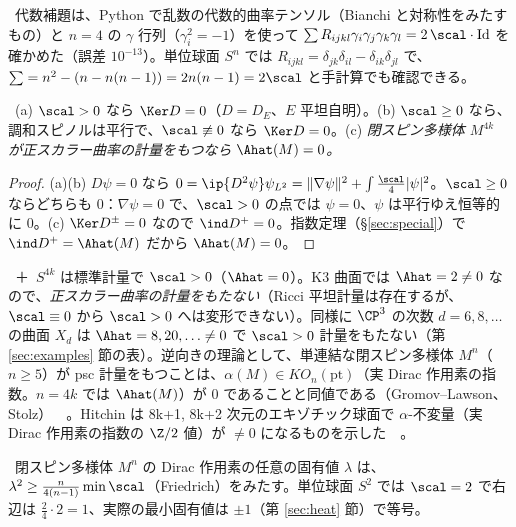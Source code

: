 \begin{rem}[検算]\label{rem:LichCheck}\tP\
代数補題は、Python で乱数の代数的曲率テンソル（Bianchi と対称性をみたすもの）と $n=4$ の $\gamma$ 行列（$\gamma_i^2=-1$）を使って $\sum R_{ijkl}\gamma_i\gamma_j\gamma_k\gamma_l=2\,\scal\cdot\mathrm{Id}$ を確かめた（誤差 $10^{-13}$）。単位球面 $S^n$ では $R_{ijkl}=\delta_{jk}\delta_{il}-\delta_{ik}\delta_{jl}$ で、$\sum=n^2-(n-n(n-1))=2n(n-1)=2\scal$ と手計算でも確認できる。
\end{rem}
\begin{cor}[Lichnerowicz]\label{cor:Lich}\tP\
(a) $\scal>0$ なら $\Ker D=0$（$D=D_{E}$、$E$ 平坦自明）。(b) $\scal\ge0$ なら、調和スピノルは平行で、$\scal\not\equiv0$ なら $\Ker D=0$。(c) \emph{閉スピン多様体 $M^{4k}$ が正スカラー曲率の計量をもつなら $\Ahat(M)=0$。}
\end{cor}
\begin{proof}
(a)(b) $D\psi=0$ なら $0=\ip{D^2\psi}\psi_{L^2}=\|\nabla\psi\|^2+\int\frac{\scal}4|\psi|^2$。$\scal\ge0$ ならどちらも $0$：$\nabla\psi=0$ で、$\scal>0$ の点では $\psi=0$、$\psi$ は平行ゆえ恒等的に $0$。(c) $\Ker D^\pm=0$ なので $\ind D^+=0$。指数定理（\S\ref{sec:special}）で $\ind D^+=\Ahat(M)$ だから $\Ahat(M)=0$。
\end{proof}
\begin{ex}\label{ex:psc}\tC\ ＋\tP\
$S^{4k}$ は標準計量で $\scal>0$（$\Ahat=0$）。K3 曲面では $\Ahat=2\ne0$ なので、\emph{正スカラー曲率の計量をもたない}（Ricci 平坦計量は存在するが、$\scal\equiv0$ から $\scal>0$ へは変形できない）。同様に $\CP^3$ の次数 $d=6,8,\ldots$ の曲面 $X_d$ は $\Ahat=8,20,\dots\ne0$ で $\scal>0$ 計量をもたない（第 \ref{sec:examples} 節の表）。逆向きの理論として、単連結な閉スピン多様体 $M^n$（$n\ge5$）が psc 計量をもつことは、$\alpha(M)\in KO_n(\mathrm{pt})$（実 Dirac 作用素の指数。$n=4k$ では $\Ahat(M)$）が $0$ であることと同値である（Gromov--Lawson、Stolz）\tC\ \tQ\ 。Hitchin は 8k+1, 8k+2 次元のエキゾチック球面で $\alpha$-不変量（実 Dirac 作用素の指数の $\Z/2$ 値）が $\ne0$ になるものを示した\tC\ \tQ\ 。
\end{ex}
\begin{rem}[Friedrich の不等式]\label{rem:Fried}\tC\
閉スピン多様体 $M^n$ の Dirac 作用素の任意の固有値 $\lambda$ は、$\lambda^2\ge\frac n{4(n-1)}\min\scal$（Friedrich）をみたす。単位球面 $S^2$ では $\scal=2$ で右辺は $\frac24\cdot2=1$、実際の最小固有値は $\pm1$（第 \ref{sec:heat} 節）で等号。
\end{rem}


